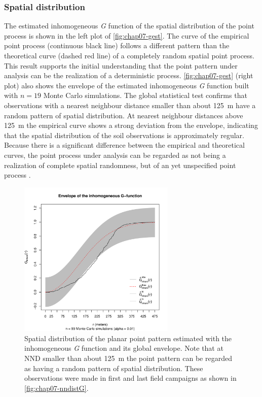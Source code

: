 \subsubsection{Spatial distribution}

The estimated inhomogeneous \emph{G} function of the spatial distribution of the point process is shown in the 
left plot of \autoref{fig:chap07-gest}. The curve of the empirical point process (continuous black line) 
follows a different pattern than the theoretical curve (dashed red line) of a completely random spatial point 
process. This result supports the initial understanding that the point pattern under analysis can be the 
realization of a deterministic process. \autoref{fig:chap07-gest} (right plot) also shows the envelope of the 
estimated inhomogeneous \emph{G} function built with $n = 19$ Monte Carlo simulations. The global statistical 
test confirms that observations with a nearest neighbour distance smaller than about \SI{125}{\m} have a 
random pattern of spatial distribution. At nearest neighbour distances above \SI{125}{\m} the empirical curve 
shows a strong deviation from the envelope, indicating that the spatial distribution of the soil observations 
is approximately regular. Because there is a significant difference between the empirical and theoretical 
curves, the point process under analysis can be regarded as not being a realization of complete spatial 
randomness, but of an yet unspecified point process \cite{Baddeley2010}.

\begin{figure}[!ht]
 \centering
 \includegraphics[trim=0mm 0mm 0mm 12mm,clip=true,width=7.5cm]{fig/chap07-gest-sim}

 \caption{Spatial distribution of the planar point pattern estimated with the inhomogeneous \emph{G} function 
 and its global envelope. Note that at NND smaller than about \SI{125}{\m} the point 
 pattern can be regarded as having a random pattern of spatial distribution. These observations were made in 
 first and last field campaigns as shown in \autoref{fig:chap07-nndistG}.}
\label{fig:chap07-gest}
\end{figure}

